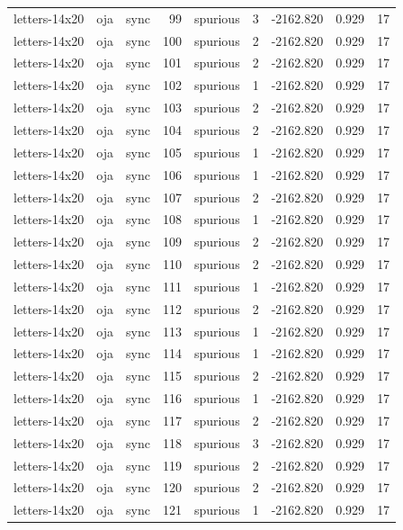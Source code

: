 \begin{tabular}{lllrlrrrr}
letters-14x20 & oja & sync & 99 & spurious & 3 & -2162.820 & 0.929 & 17 \\
letters-14x20 & oja & sync & 100 & spurious & 2 & -2162.820 & 0.929 & 17 \\
letters-14x20 & oja & sync & 101 & spurious & 2 & -2162.820 & 0.929 & 17 \\
letters-14x20 & oja & sync & 102 & spurious & 1 & -2162.820 & 0.929 & 17 \\
letters-14x20 & oja & sync & 103 & spurious & 2 & -2162.820 & 0.929 & 17 \\
letters-14x20 & oja & sync & 104 & spurious & 2 & -2162.820 & 0.929 & 17 \\
letters-14x20 & oja & sync & 105 & spurious & 1 & -2162.820 & 0.929 & 17 \\
letters-14x20 & oja & sync & 106 & spurious & 1 & -2162.820 & 0.929 & 17 \\
letters-14x20 & oja & sync & 107 & spurious & 2 & -2162.820 & 0.929 & 17 \\
letters-14x20 & oja & sync & 108 & spurious & 1 & -2162.820 & 0.929 & 17 \\
letters-14x20 & oja & sync & 109 & spurious & 2 & -2162.820 & 0.929 & 17 \\
letters-14x20 & oja & sync & 110 & spurious & 2 & -2162.820 & 0.929 & 17 \\
letters-14x20 & oja & sync & 111 & spurious & 1 & -2162.820 & 0.929 & 17 \\
letters-14x20 & oja & sync & 112 & spurious & 2 & -2162.820 & 0.929 & 17 \\
letters-14x20 & oja & sync & 113 & spurious & 1 & -2162.820 & 0.929 & 17 \\
letters-14x20 & oja & sync & 114 & spurious & 1 & -2162.820 & 0.929 & 17 \\
letters-14x20 & oja & sync & 115 & spurious & 2 & -2162.820 & 0.929 & 17 \\
letters-14x20 & oja & sync & 116 & spurious & 1 & -2162.820 & 0.929 & 17 \\
letters-14x20 & oja & sync & 117 & spurious & 2 & -2162.820 & 0.929 & 17 \\
letters-14x20 & oja & sync & 118 & spurious & 3 & -2162.820 & 0.929 & 17 \\
letters-14x20 & oja & sync & 119 & spurious & 2 & -2162.820 & 0.929 & 17 \\
letters-14x20 & oja & sync & 120 & spurious & 2 & -2162.820 & 0.929 & 17 \\
letters-14x20 & oja & sync & 121 & spurious & 1 & -2162.820 & 0.929 & 17 \\

\end{tabular}
